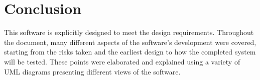 \documentclass[]{IEEEtran}
\begin{document}
\section{Conclusion}
	This software is explicitly designed to meet the design requirements. Throughout the document, many different aspects of the software's development were covered, starting from the risks taken and the earliest design to how the completed system will be tested. These points were elaborated and explained using a variety of UML diagrams presenting different views of the software. 

	


\end{document}
